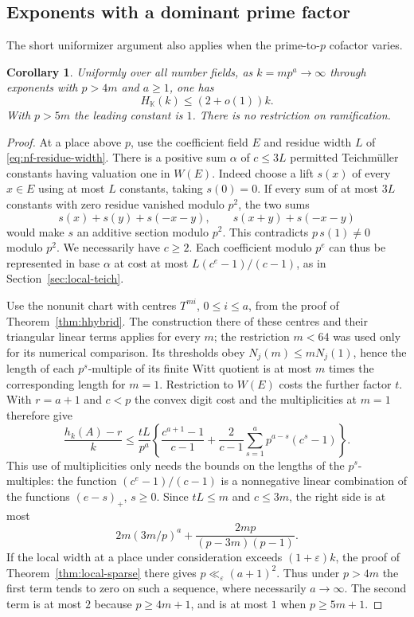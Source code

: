 \documentclass[11pt,letterpaper]{article}
\newtheorem{corollary}[corollary]{Corollary}
\theoremstyle{definition}
\numberwithin{equation}{section}
\begin{document}
\subsection{Exponents with a dominant prime factor}
\label{sec:local-dominant-prime}
The short uniformizer argument also applies when the prime-to-$p$
cofactor varies.
\begin{corollary}\label{cor:local-dominant-prime}
Uniformly over all number fields, as $k=mp^a\to\infty$ through exponents
with $p>4m$ and $a\ge1$, one has
\[
              H_{\mathbb K}(k)\le (2+o(1))k.
\]
With $p>5m$ the leading constant is $1$. There is no restriction
on ramification.
\end{corollary}
\begin{proof}
At a place above $p$, use the coefficient field $E$ and residue
width $L$ of \eqref{eq:nf-residue-width}. There is a positive sum
$\alpha$ of $c\le3L$ permitted Teichm\"uller constants having valuation
one in $W(E)$. Indeed choose a lift $s(x)$ of every $x\in E$ using
at most $L$ constants, taking $s(0)=0$. If every sum of at most
$3L$ constants with zero residue vanished modulo $p^2$, the two
sums
\[
  s(x)+s(y)+s(-x-y),\qquad s(x+y)+s(-x-y)
\]
would make $s$ an additive section modulo $p^2$. This contradicts
$p\,s(1)\ne0$ modulo $p^2$. We necessarily have $c\ge2$.
Each coefficient modulo $p^e$ can thus be represented in base
$\alpha$ at cost at most $L(c^e-1)/(c-1)$, as in
Section~\ref{sec:local-teich}.

Use the nonunit chart with centres $T^{mi}$, $0\le i\le a$, from
the proof of Theorem~\ref{thm:hhybrid}. The construction there of
these centres and their triangular linear terms applies for every $m$;
the restriction $m<64$ was used only for its numerical comparison.
Its thresholds obey $N_j(m)\le mN_j(1)$, hence the length of each
$p^s$-multiple of its finite Witt quotient is at most $m$ times
the corresponding length for $m=1$. Restriction to $W(E)$ costs
the further factor $t$. With $r=a+1$ and $c<p$ the convex digit
cost and the multiplicities at $m=1$ therefore give
\[
 \frac{h_k(A)-r}{k}\le
 \frac{tL}{p^a}\left\{\frac{c^{a+1}-1}{c-1}
   +\frac{2}{c-1}\sum_{s=1}^a p^{a-s}(c^s-1)\right\}.
\]
This use of multiplicities only needs the bounds on the lengths of
the $p^s$-multiples: the function $(c^e-1)/(c-1)$ is a nonnegative
linear combination of the functions $(e-s)_+$, $s\ge0$.
Since $tL\le m$ and $c\le3m$, the right side is at most
\[
        2m(3m/p)^a+\frac{2mp}{(p-3m)(p-1)}.
\]
If the local width at a place under consideration exceeds
$(1+\varepsilon)k$, the proof of Theorem~\ref{thm:local-sparse}
there gives $p\ll_\varepsilon(a+1)^2$. Thus under $p>4m$ the
first term tends to zero on such a sequence, where necessarily
$a\to\infty$. The second term is at most $2$ because $p\ge4m+1$,
and is at most $1$ when $p\ge5m+1$.


\end{proof}
\end{document}
